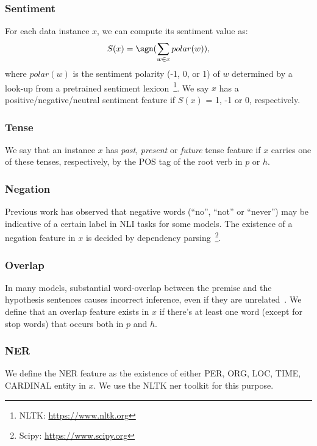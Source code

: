 \subsubsection{Sentiment}

For each data instance $x$, we can compute its sentiment value as:
\begin{equation}
S(x) = \sgn(\sum_{w \in x} polar(w)),
\end{equation}
where $polar(w)$ is the sentiment polarity (-1, 0, or 1)
of $w$ determined by a look-up from a pretrained sentiment 
lexicon~\footnote{NLTK: \url{https://www.nltk.org}}.
We say $x$ has a positive/negative/neutral sentiment feature if $S(x)$ = 1, -1 or 0,
respectively.

\subsubsection{Tense}
We say that an instance $x$ has  
\textit{past}, \textit{present} or \textit{future} tense feature if $x$
carries one of these tenses, respectively, by the POS tag of the root verb
in $p$ or $h$. 

\subsubsection{Negation}
Previous work has observed that negative words (``no'', ``not'' or ``never'') 
may be indicative of a certain label in NLI tasks for some models.
The existence of a negation feature in $x$ is decided by dependency 
parsing~\footnote{Scipy: \url{https://www.scipy.org}}. 

\subsubsection{Overlap}
In many models, substantial word-overlap between the premise and the
hypothesis sentences causes incorrect inference, 
even if they are unrelated~\cite{mccoy2019right}. 
We define that an overlap feature exists in $x$ if there's at least one word
(except for stop words) that occurs both in $p$ and $h$. 

\subsubsection{NER}
We define the NER feature as the existence of either PER,
ORG, LOC, TIME, CARDINAL entity in $x$.
We use the NLTK ner toolkit for this purpose. 

